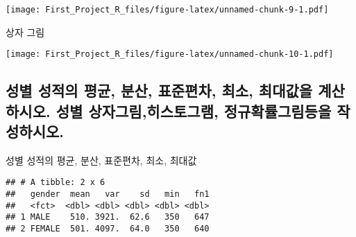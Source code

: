 \documentclass[
]{article}
\newenvironment{Shaded}{\begin{snugshade}}{\end{snugshade}}
\newcommand{\DataTypeTok}[1]{\textcolor[rgb]{0.13,0.29,0.53}{#1}}
\newcommand{\KeywordTok}[1]{\textcolor[rgb]{0.13,0.29,0.53}{\textbf{#1}}}
\newcommand{\NormalTok}[1]{#1}
\newcommand{\OperatorTok}[1]{\textcolor[rgb]{0.81,0.36,0.00}{\textbf{#1}}}
\newcommand{\StringTok}[1]{\textcolor[rgb]{0.31,0.60,0.02}{#1}}
\begin{document}
\texttt{[image: First\_Project\_R\_files/figure-latex/unnamed-chunk-9-1.pdf]}

상자 그림

\begin{Shaded}
\end{Shaded}

\texttt{[image: First\_Project\_R\_files/figure-latex/unnamed-chunk-10-1.pdf]}

\hypertarget{uxc131uxbcc4-uxc131uxc801uxc758-uxd3c9uxade0-uxbd84uxc0b0-uxd45cuxc900uxd3b8uxcc28-uxcd5cuxc18c-uxcd5cuxb300uxac12uxc744-uxacc4uxc0b0uxd558uxc2dcuxc624.-uxc131uxbcc4-uxc0c1uxc790uxadf8uxb9bcuxd788uxc2a4uxd1a0uxadf8uxb7a8-uxc815uxaddcuxd655uxb960uxadf8uxb9bcuxb4f1uxc744-uxc791uxc131uxd558uxc2dcuxc624.}{%
\subsection{성별 성적의 평균, 분산, 표준편차, 최소, 최대값을 계산하시오.
성별 상자그림,히스토그램, 정규확률그림등을
작성하시오.}\label{uxc131uxbcc4-uxc131uxc801uxc758-uxd3c9uxade0-uxbd84uxc0b0-uxd45cuxc900uxd3b8uxcc28-uxcd5cuxc18c-uxcd5cuxb300uxac12uxc744-uxacc4uxc0b0uxd558uxc2dcuxc624.-uxc131uxbcc4-uxc0c1uxc790uxadf8uxb9bcuxd788uxc2a4uxd1a0uxadf8uxb7a8-uxc815uxaddcuxd655uxb960uxadf8uxb9bcuxb4f1uxc744-uxc791uxc131uxd558uxc2dcuxc624.}}

성별 성적의 평균, 분산, 표준편차, 최소, 최대값

\begin{Shaded}
\end{Shaded}

\begin{verbatim}
## # A tibble: 2 x 6
##   gender  mean   var    sd   min   fn1
##   <fct>  <dbl> <dbl> <dbl> <dbl> <dbl>
## 1 MALE    510. 3921.  62.6   350   647
## 2 FEMALE  501. 4097.  64.0   350   640
\end{verbatim}
\end{document}

